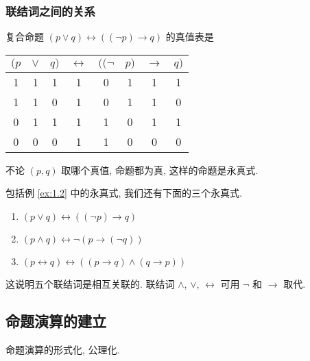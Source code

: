 \documentclass[
    color=black,
    device=normal,
    lang=cn
]{elegantnote}
\begin{document}
\subsubsection{联结词之间的关系}
\begin{example}\label{ex:1.2}
    复合命题 $(p \lor q)\leftrightarrow ((\lnot p)\to q)$ 的真值表是
    \begin{table}[!htbp]
        \centering
        \begin{tabular}{ccc|c|cccc}
            $(p$ & $\lor$ & $q)$ & $\leftrightarrow$ & $((\lnot$ & $p)$ & $\to$ & $q)$ \\
            \hline
            1    & 1      & 1    & 1                 & 0         & 1    & 1     & 1    \\
            1    & 1      & 0    & 1                 & 0         & 1    & 1     & 0    \\
            0    & 1      & 1    & 1                 & 1         & 0    & 1     & 1    \\
            0    & 0      & 0    & 1                 & 1         & 0    & 0     & 0
        \end{tabular}
    \end{table}
    不论 $(p, q)$ 取哪个真值, 命题都为真, 这样的命题是永真式.
\end{example}
包括例 \ref{ex:1.2} 中的永真式, 我们还有下面的三个永真式.
\begin{enumerate}[topsep = -1em]
    \item $(p \lor q)\leftrightarrow ((\lnot p)\to q)$
    \item $(p \land q)\leftrightarrow \lnot(p\to (\lnot q))$
    \item $(p\leftrightarrow q)\leftrightarrow ((p\to q)\land (q\to p))$
\end{enumerate}
这说明五个联结词是相互关联的. 联结词 $\land$, $\lor$, $\leftrightarrow$ 可用 $\lnot$ 和 $\to$ 取代.

\subsection{命题演算的建立}
命题演算的形式化, 公理化.
\end{document}
